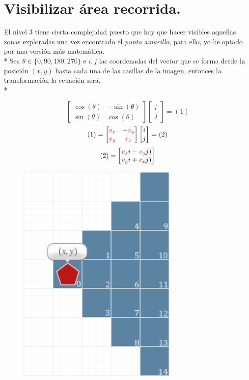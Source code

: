 \documentclass[12pt,a4paper]{report}
\begin{document}
	\section{Visibilizar área recorrida.}
	El nivel 3 tiene cierta complejidad puesto que hay que hacer visibles aquellas zonas exploradas una vez encontrado el \textit{punto amarillo}, para ello, yo he optado por una versión más matemática.\\*
	Sea $\theta \in \{0, 90, 180, 270\}$ e $i, j$ las coordenadas del vector que se forma desde la posición $(x,y)$ hasta cada una de las casillas de la imagen, entonces la transformación la ecuación será.\\*
	\begin{figure}[h]
		\centering
		\begin{minipage}{.6\textwidth}
			\[
			\begin{bmatrix}
			\cos(\theta) & -\sin(\theta)\\
			\sin(\theta) & \cos(\theta)
			\end{bmatrix}
			\begin{bmatrix}
			i\\ j
			\end{bmatrix}
			=(1)
			\]
			\[(1)=
			\begin{bmatrix}
			\textcolor{red}{v_x} & -\textcolor{red}{v_y}\\
			\textcolor{red}{v_y} & \textcolor{red}{v_x}
			\end{bmatrix}
			\begin{bmatrix}
			i\\j
			\end{bmatrix}=(2)
			\]
			\[
			(2)=\begin{bmatrix}
			\textcolor{red}{v_x}i-\textcolor{red}{v_y}j)\\\textcolor{red}{v_y}i+\textcolor{red}{v_x}j)
			\end{bmatrix}
			\]
		\end{minipage}%
		\begin{minipage}{.5\textwidth}
			\centering
			\includegraphics[width=0.7\textwidth]{player_or.png}

\end{minipage}
\end{figure}
\end{document}

